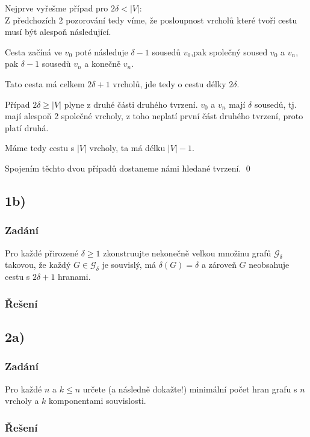 \documentclass[../main.tex]{subfiles}
\begin{document}
Nejprve vyřešme případ pro $2\delta < |V|$:\\
Z předchozích 2 pozorování tedy víme, že posloupnost vrcholů které tvoří cestu musí být alespoň následující.

Cesta začíná ve $v_0$ poté následuje $\delta - 1$ sousedů $v_0$,pak společný soused $v_0$ a $v_n$,
pak $\delta - 1$ sousedů $v_n$ a konečně $v_n$.

Tato cesta má celkem $2\delta +1$ vrcholů, jde tedy o cestu délky $2\delta$.

Případ $2\delta \geq |V|$ plyne z druhé části druhého tvrzení. $v_0$ a $v_n$ mají $\delta$ sousedů, 
tj. mají alespoň 2 společné vrcholy, z toho neplatí první část druhého tvrzení, proto platí druhá.

Máme tedy cestu s $|V|$ vrcholy, ta má délku $|V|-1$.

Spojením těchto dvou případů dostaneme námi hledané tvrzení. 
\qed



\subsection{1b)}
\subsubsection*{Zadání}
Pro každé přirozené $\delta\geq1$ zkonstruujte nekonečně velkou
množinu grafů $\mathcal{G}_\delta$ takovou, že každý $G\in\mathcal{G}_\delta$ je souvislý,
má $\delta(G) = \delta$ a zároveň $G$ neobsahuje cestu s $2\delta +1$ hranami.

\subsubsection*{Řešení}

\subsection{2a)}
\subsubsection*{Zadání}
Pro každé $n$ a $k\leq n$ určete (a následně dokažte!) minimální počet hran grafu
s $n$ vrcholy a $k$ komponentami souvislosti.

\subsubsection*{Řešení}
\end{document}
